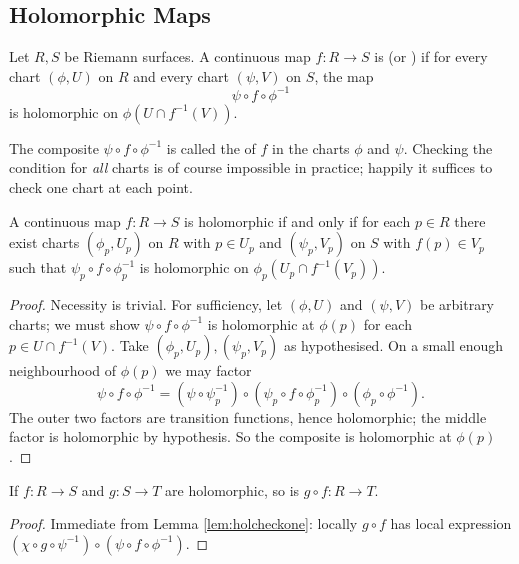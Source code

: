 \documentclass[a4paper]{scrartcl}
\begin{document}
\subsection{Holomorphic Maps}

\begin{definition}
	Let $R, S$ be Riemann surfaces. A continuous map $f : R \to S$ is
	 (or ) if for every chart $(\phi, U)$ on $R$ and
	every chart $(\psi, V)$ on $S$, the map
	$$
	\psi \circ f \circ \phi^{-1}
	$$
	is holomorphic on $\phi(U \cap f^{-1}(V))$.
\end{definition}

The composite $\psi \circ f \circ \phi^{-1}$ is called the  of
$f$ in the charts $\phi$ and $\psi$. Checking the condition for \emph{all} charts is of
course impossible in practice; happily it suffices to check one chart at each point.

\begin{lemma}\label{lem:holcheckone}
	A continuous map $f : R \to S$ is holomorphic if and only if for each $p \in R$ there
	exist charts $(\phi_p, U_p)$ on $R$ with $p \in U_p$ and $(\psi_p, V_p)$ on $S$ with
	$f(p) \in V_p$ such that $\psi_p \circ f \circ \phi_p^{-1}$ is holomorphic on
	$\phi_p(U_p \cap f^{-1}(V_p))$.
\end{lemma}

\begin{proof}
	Necessity is trivial. For sufficiency, let $(\phi, U)$ and $(\psi, V)$ be arbitrary
	charts; we must show $\psi \circ f \circ \phi^{-1}$ is holomorphic at $\phi(p)$ for
	each $p \in U \cap f^{-1}(V)$. Take $(\phi_p, U_p), (\psi_p, V_p)$ as hypothesised.
	On a small enough neighbourhood of $\phi(p)$ we may factor
	$$
	\psi \circ f \circ \phi^{-1} = (\psi \circ \psi_p^{-1}) \circ (\psi_p \circ f \circ \phi_p^{-1}) \circ (\phi_p \circ \phi^{-1}).
	$$
	The outer two factors are transition functions, hence holomorphic; the middle factor is
	holomorphic by hypothesis. So the composite is holomorphic at $\phi(p)$.
\end{proof}

\begin{lemma}\label{lem:compholo}
	If $f : R \to S$ and $g : S \to T$ are holomorphic, so is $g \circ f : R \to T$.
\end{lemma}

\begin{proof}
	Immediate from Lemma \ref{lem:holcheckone}: locally $g \circ f$ has local expression
	$(\chi \circ g \circ \psi^{-1}) \circ (\psi \circ f \circ \phi^{-1})$.
\end{proof}
\end{document}
